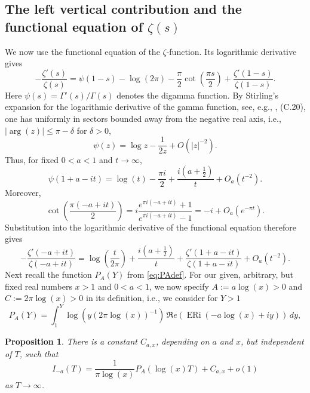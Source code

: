 \documentclass[a4paper,10pt]{amsart}
\DeclareMathOperator{\ERi}{ERi}
\newtheorem{proposition}[equation]{Proposition}
\theoremstyle{definition}
\numberwithin{equation}{section}
\begin{document}
\subsection{The left vertical contribution and the functional equation of $\zeta(s)$}
We now use the functional equation of the $\zeta$-function. Its logarithmic derivative gives
$$
-\frac{\zeta'(s)}{\zeta(s)} = \psi(1-s)-\log(2\pi) -\frac{\pi}{2}\cot\left(\frac{\pi s}{2}\right) +\frac{\zeta'(1-s)}{\zeta(1-s)}.
$$
Here $\psi(s)=\Gamma'(s)/\Gamma(s)$ denotes the digamma function. By Stirling's expansion for the logarithmic derivative of the gamma function, see, e.g., \cite{MontgomeryVaughan}, (C.20), one has uniformly in sectors bounded away from the negative real axis, i.e., $|\arg(z)|\leq \pi-\delta$ for $\delta>0$,
$$
\psi(z)=\log z-\frac{1}{2z}+O(|z|^{-2}).
$$
Thus, for fixed $0<a<1$ and $t\to\infty$,
$$
\psi(1+a-it) = \log(t)-\frac{\pi i}{2} +\frac{i(a+\tfrac12)}{t} +O_a(t^{-2}).
$$
Moreover,
$$
\cot\left(\frac{\pi(-a+it)}2\right) =i\frac{e^{\pi i(-a+it)}+1}{e^{\pi i(-a+it)}-1} = -i+O_a(e^{-\pi t}).
$$
Substitution into the logarithmic derivative of the functional equation therefore gives
\begin{equation}\label{stirling}
-\frac{\zeta'(-a+it)}{\zeta(-a+it)} = \log\left(\frac{t}{2\pi}\right) +\frac{i(a+\tfrac12)}t +\frac{\zeta'(1+a-it)}{\zeta(1+a-it)} +O_a(t^{-2}).
\end{equation}
Next recall the function $P_A(Y)$ from \eqref{eq:PAdef}. For our given, arbitrary, but fixed real numbers $x>1$ and $0<a<1$, we now specify $A:=a\log(x)>0$ and $C:=2\pi \log(x)>0$ in its definition, i.e., we consider for $Y>1$
$$
P_A(Y) = \int_1^Y \log(y(2\pi \log(x))^{-1})\,
\Re e(\ERi(-a\log(x)+iy))\,dy,
$$


\begin{proposition}\label{prop:left}
There is a constant $C_{a,x}$, depending on $a$ and $x$, but independent of $T$, such that
$$
I_{-a}(T) = \frac{1}{\pi \log(x)}P_A(\log(x)T) +  C_{a,x} + o(1)
$$
as $T\to\infty$.
\end{proposition}
\end{document}

